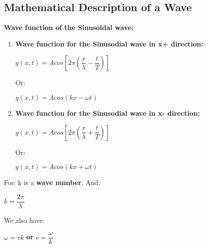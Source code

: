 \documentclass[10pt]{article}
\begin{document}
\bigbreak
\subsection{Mathematical Description of a Wave}
\textbf{Wave function of the Sinusoidal wave:}
\begin{enumerate}
	\item \textbf{Wave function for the Sinusodial wave in x+ direction:}
\begin{mybox}
	\begin{center}
		$y(x, t) = A cos \left[2 \pi \left(\dfrac{x}{\lambda} - \dfrac{t}{T} \right) \right]$
	\end{center}
\end{mybox}
Or: \\
\begin{mybox}
	\begin{center}
		$y(x, t) = A cos(kx - \omega t)$ \\
	\end{center}
\end{mybox}
	\item \textbf{Wave function for the Sinusodial wave in x- direction:}
	\begin{mybox}
	\begin{center}
		$y(x, t) = A cos \left[2 \pi \left(\dfrac{x}{\lambda} + \dfrac{t}{T} \right) \right]$
	\end{center}
\end{mybox}
Or: \\
\begin{mybox}
	\begin{center}
		$y(x, t) = A cos(kx + \omega t)$ \\
	\end{center}
\end{mybox}

\end{enumerate}

For: k is a \textbf{wave number}. And: \\
\begin{mybox}
	\begin{center}
		$k = \dfrac{2 \pi}{\lambda}$
	\end{center}
\end{mybox}

\bigbreak
We also have: \\
\begin{mybox}
	\begin{center}
		$\omega = vk$ \textbf{or} $v = \dfrac{\omega}{k}$
	\end{center}
\end{mybox}
\end{document}
